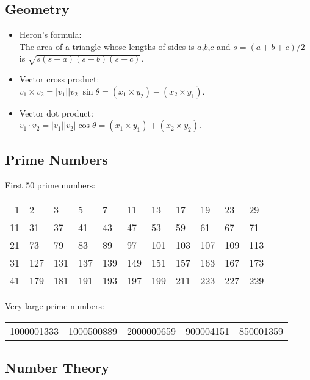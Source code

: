 \documentclass[twocolumn]{article}
\begin{document}
\subsection{Geometry}

\begin{itemize}
    \item Heron's formula:\\ The area of a triangle whose lengths of sides is $a$,$b$,$c$ and $s = (a + b + c) / 2$ is $\sqrt{s(s-a)(s-b)(s-c)}$.
    \item Vector cross product:\\ $v_1 \times v_2 = |v_1||v_2| \sin \theta = (x_1 \times y_2) - (x_2 \times y_1)$.
    \item Vector dot product:\\ $v_1 \cdot v_2 = |v_1||v_2| \cos \theta = (x_1 \times y_1) + (x_2 \times y_2)$.
\end{itemize}

\subsection{Prime Numbers}

First 50 prime numbers:\\
\begin{tabular}{r|llllllllll}
    1 & 2 & 3 & 5 & 7 & 11 & 13 & 17 & 19 & 23 & 29\\
    11 & 31 & 37 & 41 & 43 & 47 & 53 & 59 & 61 & 67 & 71\\
    21 & 73 & 79 & 83 & 89 & 97 & 101 & 103 & 107 & 109 & 113\\
    31 & 127 & 131 & 137 & 139 & 149 & 151 & 157 & 163 & 167 & 173\\
    41 & 179 & 181 & 191 & 193 & 197 & 199 & 211 & 223 & 227 & 229
\end{tabular}

Very large prime numbers:\\
\begin{tabular}{ccccc}
    1000001333 & 1000500889 & 2000000659 & 900004151 & 850001359
\end{tabular}

\subsection{Number Theory}
\end{document}
